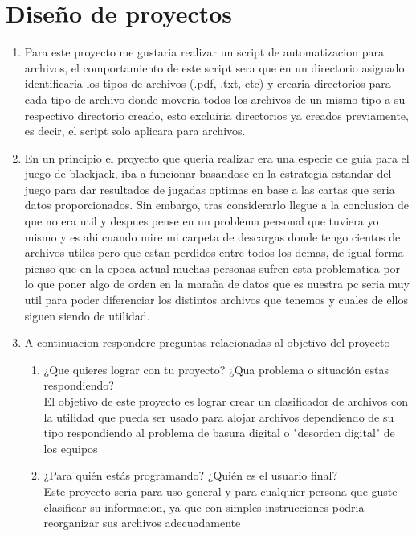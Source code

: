 \documentclass{article}
\begin{document}
\section*{\LARGE{Diseño de proyectos}}


\begin{enumerate}
      \item Para este proyecto me gustaria realizar un script de automatizacion para archivos, el comportamiento de este script sera que en un directorio asignado identificaria los tipos de archivos (.pdf, .txt, etc) y crearia directorios para cada tipo de archivo donde moveria todos los archivos de un mismo tipo a su respectivo directorio creado, esto excluiria directorios ya creados previamente, es decir, el script solo aplicara para archivos.

  \item En un principio el proyecto que queria realizar era una especie de guia para el juego de blackjack,  iba a funcionar basandose en la estrategia estandar del juego para dar resultados de jugadas optimas en base a las cartas que seria datos proporcionados. Sin embargo, tras considerarlo llegue a la conclusion de que no era util y despues pense en un problema personal que tuviera yo mismo y es ahi cuando mire mi carpeta de descargas donde tengo cientos de archivos utiles pero que estan perdidos entre todos los demas, de igual forma pienso que en la epoca actual muchas personas sufren esta problematica por lo que poner algo de orden en la maraña de datos que es nuestra pc seria muy util para poder diferenciar los distintos archivos que tenemos y cuales de ellos siguen siendo de utilidad.

  \item A continuacion respondere preguntas relacionadas al objetivo del proyecto
      \begin{enumerate}
      \item ¿Que quieres lograr con tu proyecto? ¿Qua problema o situación estas respondiendo?\\
      El objetivo de este proyecto es lograr crear un clasificador de archivos con la utilidad que pueda ser usado para alojar archivos dependiendo de su tipo respondiendo al problema de basura digital o "desorden digital" de los equipos

      \item ¿Para quién estás programando? ¿Quién es el usuario final?\\
      Este proyecto seria para uso general y para cualquier persona que guste clasificar su informacion, ya que con simples instrucciones podria reorganizar sus archivos adecuadamente


\end{enumerate}
\end{enumerate}
\end{document}
